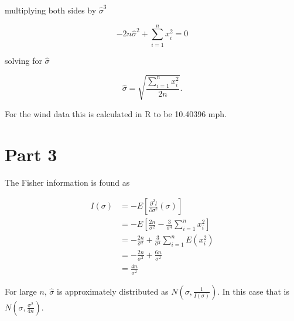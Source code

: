\documentclass[11pt]{article}
\begin{document}
multiplying both sides by $ \hat{\sigma}^3 $

$$
-2n \hat\sigma^2 + \sum_{i=1}^n{x_i^2} = 0
$$

solving for $ \hat\sigma $

$$
\hat\sigma = \sqrt{\frac{\sum_{i=1}^n{x_i^2}}{2n}} \text{.}
$$


For the wind data this is calculated in R to be 10.40396 mph.

\section*{Part 3}

The Fisher information is found as

\begin{align*}
I(\sigma) &= - E\left[ \frac{\partial^2 l}{\partial \sigma^2}(\sigma)\right] \\
&= - E\left[ \frac{2n}{\sigma^2} - \frac{3}{\sigma^4} \sum_{i=1}^n {x_i^2} \right] \\
&= - \frac{2n}{\sigma^2} + \frac{3}{\sigma^4} \sum_{i=1}^n {E(x_i^2)} \\
&= - \frac{2n}{\sigma^2} + \frac{6n}{\sigma^2} \\
&= \frac{4n}{\sigma^2}
\end{align*}

For large $ n $, $ \hat\sigma $ is approximately distributed as $ N(\sigma, \frac{1}{I(\sigma)}) $. In this case that is $ N(\sigma, \frac{\sigma^2}{4n}) $.
\end{document}

